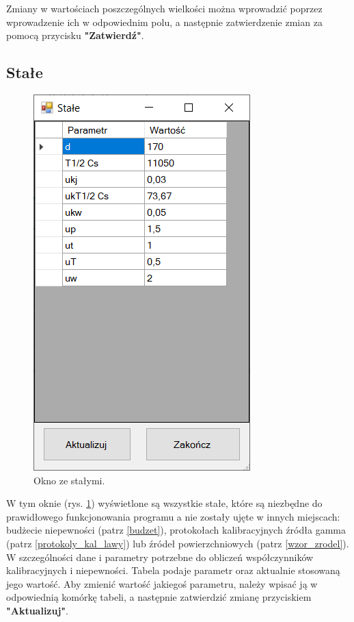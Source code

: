 Zmiany w wartościach poszczególnych wielkości można wprowadzić poprzez wprowadzenie ich w odpowiednim polu, a następnie zatwierdzenie zmian za pomocą przycisku \textbf{"Zatwierdź"}.



\subsection{Stałe}

\label{stale}
\begin{figure}[htb]
	\centering
	\includegraphics{obrazki/Ustawienia/stale.png}
	\caption{Okno ze stałymi.}
	\label{staleOkno}
\end{figure}

W tym oknie (rys. \ref{staleOkno}) wyświetlone są wszystkie stałe, które są niezbędne do prawidłowego funkcjonowania programu a nie zostały ujęte w innych miejscach: budżecie niepewności (patrz \ref{budzet}), protokołach kalibracyjnych źródła gamma (patrz \ref{protokoly_kal_lawy}) lub źródeł powierzchniowych (patrz \ref{wzor_zrodel}). W szczególności dane i parametry potrzebne do obliczeń współczynników kalibracyjnych i niepewności. Tabela podaje parametr oraz aktualnie stosowaną jego wartość. 
Aby zmienić wartość jakiegoś parametru, należy wpisać ją w odpowiednią komórkę tabeli, a następnie zatwierdzić zmianę przyciskiem \textbf{"Aktualizuj"}.

